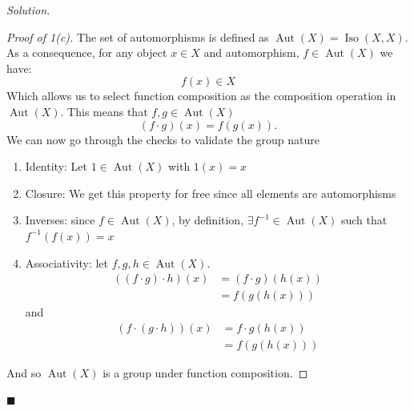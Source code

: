 \documentclass[11pt]{article}
\theoremstyle{plain}
\theoremstyle{definition}
\newenvironment{solution}{%
  \par\noindent\textit{Solution.}\
}{%
  \hfill$\blacksquare$\par\bigskip
}
\newcommand{\Aut}{\operatorname{Aut}}
\newcommand{\Iso}{\operatorname{Iso}}
\begin{document}
\begin{solution}
  \begin{proof}[Proof of 1(c)]
    The set of automorphisms is defined as \( \Aut (X) = \Iso(X, X)
    \). As a consequence, for any object \( x\in X \) and
    automorphism, \( f\in\Aut(X) \) we have:
    \[
      f(x)\in X
    \]
    Which allows us to select function composition as the composition
    operation in \( \Aut(X) \). This means that \( f,g\in \Aut(X) \)
    \[
      (f\cdot g)(x) = f(g(x)).
    \]
    We can now go through the checks to validate the group nature
    \begin{enumerate}
      \item Identity: Let \( 1\in \Aut(X) \) with \( 1(x) = x \)
      \item Closure: We get this property for free since all elements
        are automorphisms
      \item Inverses: since \( f\in\Aut(X) \), by definition, \(
        \exists f^{-1} \in \Aut(X) \) such that \( f^{-1}(f(x)) = x \)
      \item Associativity: let \( f,g,h \in \Aut(X) \).
        \begin{align*}
          ((f \cdot g) \cdot h)(x) &= (f\cdot g) (h(x)) \\
          &= f(g(h(x)))
        \end{align*}
        and
        \begin{align*}
          (f\cdot (g \cdot h))(x) &= f \cdot g(h(x)) \\
          &= f(g(h(x)))
        \end{align*}
    \end{enumerate}
    And so \( \Aut(X) \) is a group under function composition.
  \end{proof}


\end{solution}
\end{document}
